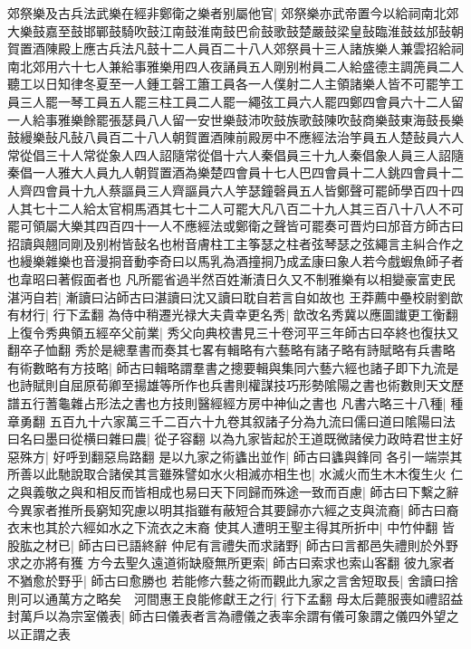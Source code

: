 郊祭樂及古兵法武樂在經非鄭衛之樂者别屬他官|{
	郊祭樂亦武帝置今以給祠南北郊大樂鼓嘉至鼓邯鄲鼓騎吹鼓江南鼓淮南鼓巴俞鼓歌鼓楚嚴鼓梁皇鼔臨淮鼓兹邡鼔朝賀置酒陳殿上應古兵法凡鼓十二人員百二十八人郊祭員十三人諸族樂人兼雲招給祠南北郊用六十七人兼給事雅樂用四人夜誦員五人剛别柎員二人給盛德主調箎員二人聽工以日知律冬夏至一人鍾工磬工簫工員各一人僕射二人主領諸樂人皆不可罷竽工員三人罷一琴工員五人罷三柱工員二人罷一繩弦工員六人罷四鄭四會員六十二人留一人給事雅樂餘罷張瑟員八人留一安世樂鼓沛吹鼓族歌鼓陳吹鼔商樂鼓東海鼓長樂鼓縵樂鼔凡鼔八員百二十八人朝賀置酒陳前殿房中不應經法治竽員五人楚鼔員六人常從倡三十人常從象人四人詔隨常從倡十六人秦倡員三十九人秦倡象人員三人詔隨秦倡一人雅大人員九人朝賀置酒為樂楚四會員十七人巴四會員十二人銚四會員十二人齊四會員十九人蔡謳員三人齊謳員六人竽瑟鐘磬員五人皆鄭聲可罷師學百四十四人其七十二人給太官桐馬酒其七十二人可罷大凡八百二十九人其三百八十八人不可罷可領屬大樂其四百四十一人不應經法或鄭衛之聲皆可罷奏可晋灼曰邡音方師古曰招讀與翹同剛及别柎皆鼔名也柎音膚柱工主筝瑟之柱者弦琴瑟之弦繩言主糾合作之也縵樂雜樂也音漫挏音動李奇曰以馬乳為酒撞挏乃成孟康曰象人若今戲蝦魚師子者也韋昭曰著假面者也}
凡所罷省過半然百姓漸漬日久又不制雅樂有以相變豪富吏民湛沔自若|{
	漸讀曰沾師古曰湛讀曰沈又讀曰耽自若言自如故也}
王莽薦中壘校尉劉歆有材行|{
	行下孟翻}
為侍中稍遷光禄大夫貴幸更名秀|{
	歆改名秀冀以應圖䜟更工衡翻}
上復令秀典領五經卒父前業|{
	秀父向典校書見三十卷河平三年師古曰卒終也復扶又翻卒子恤翻}
秀於是總羣書而奏其七畧有輯略有六藝略有諸子略有詩賦略有兵書略有術數略有方技略|{
	師古曰輯略謂羣書之摠要輯與集同六藝六經也諸子即下九流是也詩賦則自屈原荀卿至揚雄等所作也兵書則權謀技巧形勢隂陽之書也術數則天文歷譜五行蓍龜雜占形法之書也方技則醫經經方房中神仙之書也}
凡書六略三十八種|{
	種章勇翻}
五百九十六家萬三千二百六十九卷其叙諸子分為九流曰儒曰道曰隂陽曰法曰名曰墨曰從横曰雜曰農|{
	從子容翻}
以為九家皆起於王道既微諸侯力政時君世主好惡殊方|{
	好呼到翻惡烏路翻}
是以九家之術蠭出並作|{
	師古曰蠭與鋒同}
各引一端崇其所善以此馳說取合諸侯其言雖殊譬如水火相滅亦相生也|{
	水滅火而生木木復生火}
仁之與義敬之與和相反而皆相成也易曰天下同歸而殊途一致而百慮|{
	師古曰下繫之辭}
今異家者推所長窮知究慮以明其指雖有蔽短合其要歸亦六經之支與流裔|{
	師古曰裔衣末也其於六經如水之下流衣之末裔}
使其人遭明王聖主得其所折中|{
	中竹仲翻}
皆股肱之材已|{
	師古曰已語終辭}
仲尼有言禮失而求諸野|{
	師古曰言都邑失禮則於外野求之亦將有獲}
方今去聖久遠道術缺廢無所更索|{
	師古曰索求也索山客翻}
彼九家者不猶愈於野乎|{
	師古曰愈勝也}
若能修六藝之術而觀此九家之言舍短取長|{
	舍讀曰捨}
則可以通萬方之略矣　河間惠王良能修獻王之行|{
	行下孟翻}
母太后薨服喪如禮詔益封萬戶以為宗室儀表|{
	師古曰儀表者言為禮儀之表率余謂有儀可象謂之儀四外望之以正謂之表}
